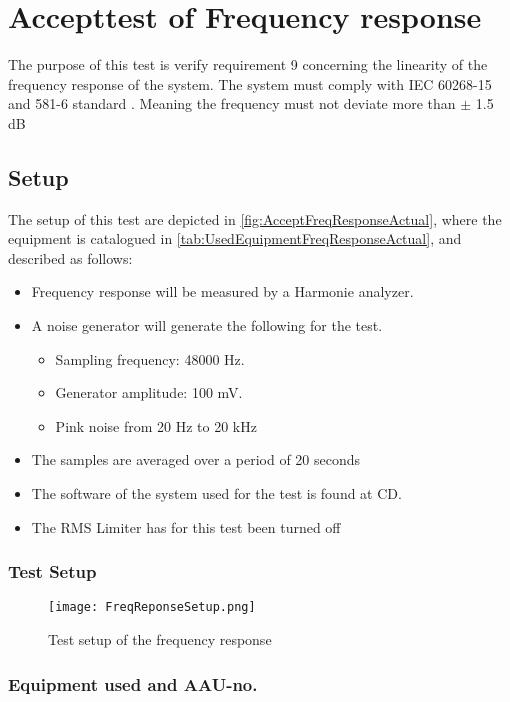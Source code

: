 \chapter{Accepttest of Frequency response}\label{app:journal_Frequency_Response}
The purpose of this test is verify requirement 9 concerning the linearity of the frequency response of the system. The system must comply with IEC 60268-15 and 581-6 standard \citep{IEC60268}. Meaning the frequency must not deviate more than $\pm$ 1.5 dB

\section{Setup}
The setup of this test are depicted in \autoref{fig:AcceptFreqResponseActual}, where the equipment is catalogued in \autoref{tab:UsedEquipmentFreqResponseActual}, and described as follows:
\begin{itemize}\addtolength{\itemsep}{-.35\baselineskip} 
\item Frequency response will be measured by a Harmonie analyzer.
\item A noise generator will generate the following for the test. 
\begin{itemize}\addtolength{\itemsep}{-.35\baselineskip} 
\item Sampling frequency: 48000 Hz.
\item Generator amplitude: 100 mV.
\item Pink noise from 20 Hz to 20 kHz
\end{itemize}
\item The samples are averaged over a period of 20 seconds
\item The software of the system used for the test is found at CD. 
\item The RMS Limiter has for this test been turned off 
\end{itemize}
\subsection*{Test Setup}
\begin{figure}[H]
\centering
\texttt{[image: FreqReponseSetup.png]}
\caption{Test setup of the frequency response}
\label{fig:AcceptFreqResponseActual}
\end{figure}

\subsection*{Equipment used and AAU-no.}

